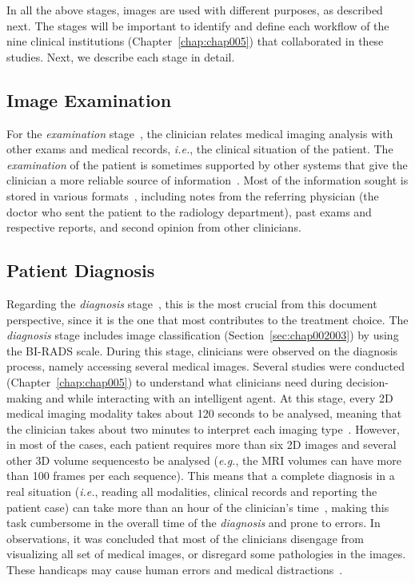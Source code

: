In all the above stages, images are used with different purposes, as described next.
The stages will be important to identify and define each workflow of the nine clinical institutions (Chapter~\ref{chap:chap005}) that collaborated in these studies.
Next, we describe each stage in detail.

\subsection{Image Examination}
\label{sec:chap002005001}

For the {\it examination} stage~\cite{8621479}, the clinician relates medical imaging analysis with other exams and medical records, {\it i.e.}, the clinical situation of the patient.
The {\it examination} of the patient is sometimes supported by other systems that give the clinician a more reliable source of information~\cite{islam2018recent, DIROBERTO2016950}.
Most of the information sought is stored in various formats~\cite{GIBSON2018113}, including notes from the referring physician (the doctor who sent the patient to the radiology department), past exams and respective reports, and second opinion from other clinicians.

\subsection{Patient Diagnosis}
\label{sec:chap002005002}

Regarding the {\it diagnosis} stage~\cite{https://doi.org/10.1002/cncr.32872}, this is the most crucial from this document perspective, since it is the one that most contributes to the treatment choice.
The {\it diagnosis} stage includes image classification (Section~\ref{sec:chap002003}) by using the \ac{BI-RADS} scale.
During this stage, clinicians were observed on the diagnosis process, namely accessing several medical images.
Several studies were conducted (Chapter~\ref{chap:chap005}) to understand what clinicians need during decision-making and while interacting with an intelligent agent.
At this stage, every 2D medical imaging modality takes about 120 seconds to be analysed, meaning that the clinician takes about two minutes to interpret each imaging type~\cite{jiang2018interpretation}.
However, in most of the cases, each patient requires more than six 2D images and several other 3D volume sequences\footnotemark[6] to be analysed ({\it e.g.}, the MRI volumes can have more than 100 frames per each sequence).
This means that a complete diagnosis in a real situation ({\it i.e.}, reading all modalities, clinical records and reporting the patient case) can take more than an hour of the clinician's time~\cite{Forsberg2017}, making this task cumbersome in the overall time of the {\it diagnosis} and prone to errors.
In observations, it was concluded that most of the clinicians disengage from visualizing all set of medical images, or disregard some pathologies in the images.
These handicaps may cause human errors and medical distractions~\cite{bruno2015understanding}.

